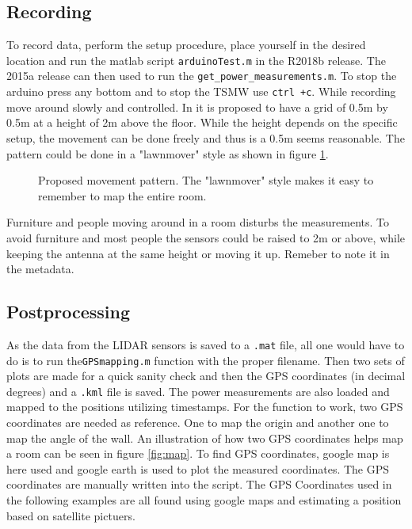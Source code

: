\documentclass[a4paper,twoside, 12pt]{article}
\begin{document}
\subsection{Recording}

To record data, perform the setup procedure, place yourself in the desired location and run the matlab script \texttt{arduinoTest.m} in the R2018b release. The 2015a release can then used to run the \texttt{get\_power\_measurements.m}. To stop the arduino press any bottom and to stop the TSMW use \texttt{ctrl +c}. While recording move around slowly and controlled. In \cite{artikel} it is proposed to have a grid of 0.5m by 0.5m at a height of 2m above the floor. While the height depends on the specific setup, the movement can be done freely and thus is a 0.5m seems reasonable. The pattern could be done in a "lawnmover" style as shown in figure \ref{fig:lawnmover}.
\begin{figure}[ht]
\centering
{}
\caption{Proposed movement pattern. The "lawnmover" style makes it easy to remember to map the entire room.}
\label{fig:lawnmover}
\end{figure}

Furniture and people moving around in a room disturbs the measurements. To avoid furniture and most people the sensors could be raised to 2m or above, while keeping the antenna at the same height or moving it up. Remeber to note it in the metadata.

\subsection{Postprocessing}
As the data from the LIDAR sensors is saved to a \texttt{.mat} file, all one would have to do is to run the\texttt{GPSmapping.m} function with the proper filename. Then two sets of plots are made for a quick sanity check and then the GPS coordinates (in decimal degrees) and a \texttt{.kml} file is saved. The power measurements are also loaded and mapped to the positions utilizing timestamps. For the function to work, two GPS coordinates are needed as reference. One to map the origin and another one to map the angle of the wall. An illustration of how two GPS coordinates helps map a room can be seen in figure \ref{fig:map}. To find GPS coordinates, google map is here used and google earth is used to plot the measured coordinates. The GPS coordinates are manually written into the script. The GPS Coordinates used in the following examples are all found using google maps and estimating a position based on satellite pictuers. 
\end{document}
